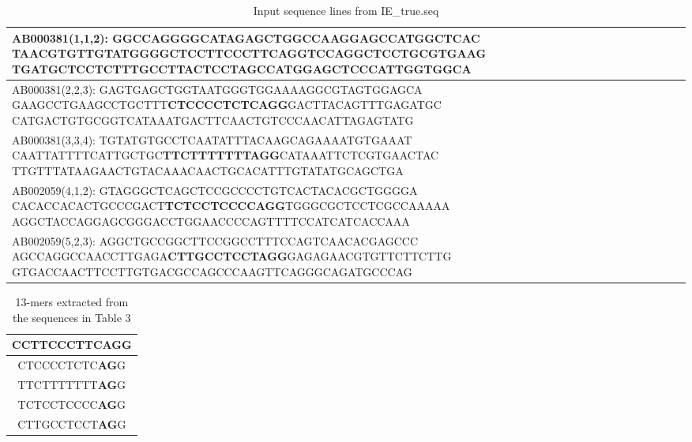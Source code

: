 \documentclass[12pt,a4paper]{article}
\begin{document}
	\begin{table}[H]
		\caption{Input sequence lines from IE\_true.seq}
		\begin{tabular}{ | p{\linewidth} |}
			\hline
			AB000381(1,1,2): GGCCAGGGGCATAGAGCTGGCCAAGGAGCCATGGCTCAC\newline
			TAACGTGTTGTATGGGGCT\textbf{CCTTCCCTTCAGG}TCCAGGCTCCTGCGTGAAG\newline
			TGATGCTCCTCTTTGCCTTACTCCTAGCCATGGAGCTCCCATTGGTGGCA \\
			\hline
			AB000381(2,2,3): GAGTGAGCTGGTAATGGGTGGAAAAGGCGTAGTGGAGCA\newline
			GAAGCCTGAAGCCTGCTTT\textbf{CTCCCCTCTCAGG}GACTTACAGTTTGAGATGC\newline
			CATGACTGTGCGGTCATAAATGACTTCAACTGTCCCAACATTAGAGTATG \\
			\hline
			AB000381(3,3,4): TGTATGTGCCTCAATATTTACAAGCAGAAAATGTGAAAT\newline
			CAATTATTTTCATTGCTGC\textbf{TTCTTTTTTTAGG}CATAAATTCTCGTGAACTAC\newline
			TTGTTTATAAGAACTGTACAAACAACTGCACATTTGTATATGCAGCTGA \\
			\hline
			AB002059(4,1,2): GTAGGGCTCAGCTCCGCCCCTGTCACTACACGCTGGGGA\newline
			CACACCACACTGCCCGACT\textbf{TCTCCTCCCCAGG}TGGGCGCTCCTCGCCAAAAA\newline
			AGGCTACCAGGAGCGGGACCTGGAACCCCAGTTTTCCATCATCACCAAA \\
			\hline
			AB002059(5,2,3): AGGCTGCCGGCTTCCGGCCTTTCCAGTCAACACGAGCCC\newline
			AGCCAGGCCAACCTTGAGA\textbf{CTTGCCTCCTAGG}GAGAGAACGTGTTCTTCTTG\newline
			GTGACCAACTTCCTTGTGACGCCAGCCCAAGTTCAGGGCAGATGCCCAG \\
			\hline
		\end{tabular}
	\end{table}
	
	\begin{table}[H]	
		\caption{13-mers extracted from the sequences in Table 3}	
		\begin{tabular}{ | c |}
			\hline
			CCTTCCCTTC\textbf{AG}G \\
			\hline
			CTCCCCTCTC\textbf{AG}G \\
			\hline
			TTCTTTTTTT\textbf{AG}G \\
			\hline
			TCTCCTCCCC\textbf{AG}G \\
			\hline
			CTTGCCTCCT\textbf{AG}G \\
			\hline
		\end{tabular}
		\centering
	\end{table}
\end{document}
